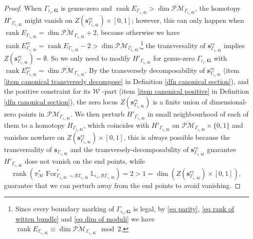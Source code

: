 \documentclass[11pt]{amsart}
\theoremstyle{definition}
\theoremstyle{remark}
\newcommand{\oPMb}{{\overline{\mathcal{PM}}}}
\newcommand{\<}{\left<}
\renewcommand{\>}{\right>}
\numberwithin{equation}{section}
\DeclareMathOperator{\rk}{rank}
\begin{document}
\begin{proof}
        When $\Gamma_{i_1,\bm{G}}$ is genus-zero and $\rk E_{\Gamma_{i_1,\bm{G}}}> \dim \oPMb_{\Gamma_{i_1,\bm{G}}}$, the homotopy $H'_{\Gamma_{i_1,\bm{G}}}$ might vanish on $Z\left(\bm{s}^{re}_{\Gamma_{i_1,\bm{G}}}\right)\times [0,1]$; however, this can only happen when  $\rk E_{\Gamma_{i_1,\bm{G}}}= \dim \oPMb_{\Gamma_{i_1,\bm{G}}}+2$, because otherwise we have  $\rk E^{re}_{\Gamma_{i_1,\bm{G}}}= \rk E_{\Gamma_{i_1,\bm{G}}}-2> \dim \oPMb_{\Gamma_{i_1,\bm{G}}}$,\footnote{Since every boundary marking of $\Gamma_{i_1,\bm{G}}$ is legal,  %
by \eqref{eq parity}, \eqref{eq rank of witten bundle} and %
\eqref{eq dim of moduli} we have $\rk E_{\Gamma_{i_1,\bm{G}}}\equiv \dim \oPMb_{\Gamma_{i_1,\bm{G}}} \mod 2$.} the transversality of $\bm{s}^{re}_{\Gamma_{i_1,\bm{G}}}$ implies $Z\left(\bm{s}^{re}_{\Gamma_{i_1,\bm{G}}}\right)=\emptyset$. So we only need to modify $H'_{\Gamma_{i_1,\bm{G}}}$ for genus-zero $\Gamma_{i_1,\bm{G}}$ with $\rk E^{re}_{\Gamma_{i_1,\bm{G}}}= \dim \oPMb_{\Gamma_{i_1,\bm{G}}}$. By the transversely decomposability of %
$\bm{s}^{re}_{\Gamma_{i_1,\bm{G}}}$ (item \ref{item canonical transversely decompose} in Definition \ref{dfn canonical section}), and %
the positive constraint for its $\mathcal W$%
-part (item \ref{item canonical positive} in Definition \ref{dfn canonical section}), the %
zero locus $Z\left(\bm{s}^{re}_{\Gamma_{i_1,\bm{G}}}\right)$ is a finite union of dimensional-zero points in $\mathcal{PM}_{\Gamma_{i_1,\bm{G}}}$. We then perturb $H'_{\Gamma_{i_1,\bm{G}}}$ in small neighbourhood of each of them to a homotopy $H_{\Gamma_{i_1,\bm{G}}}$, which coincides with $H'_{\Gamma_{i_1,\bm{G}}}$ on  $\oPMb_{\Gamma_{i_1,\bm{G}}}\times \{0,1\}$ and vanishes nowhere on $Z\left(\bm{s}^{re}_{\Gamma_{i_1,\bm{G}}}\right)\times [0,1]$, this is always possible because the transversality of $\bm{s}_{\Gamma_{i_1,\bm{G}}}$ and the transversely-decomposability of $\bm{s}^{re}_{\Gamma_{i_1,\bm{G}}}$ guarantee $H'_{\Gamma_{i_1,\bm{G}}}$ dose not vanish on the end points, while
        $$\rk \left(\pi^*_{\mathcal M} \operatorname{For}^*_{\Gamma_{i_1,\bm{G}}\to \mathcal B \Gamma_{i_1,\bm{G}}}\mathbb L_{i_1,\mathcal B \Gamma_{i_1,\bm{G}}}\right)=2>1=\dim \left(Z\left(\bm{s}^{re}_{\Gamma_{i_1,\bm{G}}}\right)\times [0,1]\right),$$
        guarantee that we can perturb away from the end points to avoid vanishing.
        

\end{proof}
\end{document}
